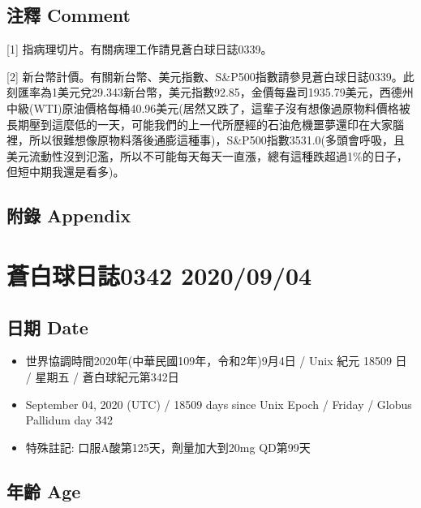 \documentclass[a5paper, 11pt
]{book}
\providecommand{\tightlist}{%
  \setlength{\itemsep}{0pt}\setlength{\parskip}{0pt}}
\begin{document}
\hypertarget{ux6ce8ux91cb-comment-2}{%
\subsection{注釋 Comment}\label{ux6ce8ux91cb-comment-2}}

{[}1{]} 指病理切片。有關病理工作請見蒼白球日誌0339。

{[}2{]}
新台幣計價。有關新台幣、美元指數、S\&P500指數請參見蒼白球日誌0339。此刻匯率為1美元兌29.343新台幣，美元指數92.85，金價每盎司1935.79美元，西德州中級(WTI)原油價格每桶40.96美元(居然又跌了，這輩子沒有想像過原物料價格被長期壓到這麼低的一天，可能我們的上一代所歷經的石油危機噩夢還印在大家腦裡，所以很難想像原物料落後通膨這種事)，S\&P500指數3531.0(多頭會呼吸，且美元流動性沒到氾濫，所以不可能每天每天一直漲，總有這種跌超過1\%的日子，但短中期我還是看多)。

\hypertarget{ux9644ux9304-appendix-2}{%
\subsection{附錄 Appendix}\label{ux9644ux9304-appendix-2}}

\hypertarget{ux84bcux767dux7403ux65e5ux8a8c0342-20200904}{%
\section{蒼白球日誌0342
2020/09/04}\label{ux84bcux767dux7403ux65e5ux8a8c0342-20200904}}

\hypertarget{ux65e5ux671f-date-3}{%
\subsection{日期 Date}\label{ux65e5ux671f-date-3}}

\begin{itemize}
\tightlist
\item
  世界協調時間2020年(中華民國109年，令和2年)9月4日 / Unix 紀元 18509 日
  / 星期五 / 蒼白球紀元第342日
\item
  September 04, 2020 (UTC) / 18509 days since Unix Epoch / Friday /
  Globus Pallidum day 342
\item
  特殊註記: 口服A酸第125天，劑量加大到20mg QD第99天
\end{itemize}

\hypertarget{ux5e74ux9f61-age-3}{%
\subsection{年齡 Age}\label{ux5e74ux9f61-age-3}}
\end{document}
